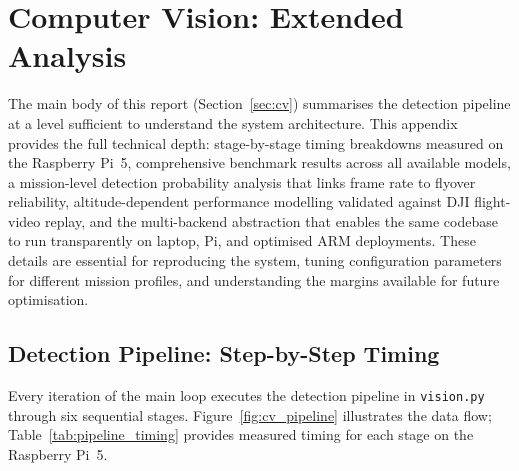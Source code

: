 
\section{Computer Vision: Extended Analysis}\label{app:cv-extended}

The main body of this report (Section~\ref{sec:cv}) summarises the detection pipeline at a level sufficient to understand the system architecture.  This appendix provides the full technical depth: stage-by-stage timing breakdowns measured on the Raspberry Pi~5, comprehensive benchmark results across all available models, a mission-level detection probability analysis that links frame rate to flyover reliability, altitude-dependent performance modelling validated against DJI flight-video replay, and the multi-backend abstraction that enables the same codebase to run transparently on laptop, Pi, and optimised ARM deployments.  These details are essential for reproducing the system, tuning configuration parameters for different mission profiles, and understanding the margins available for future optimisation.

\subsection{Detection Pipeline: Step-by-Step Timing}\label{app:cv:pipeline}

Every iteration of the main loop executes the detection pipeline in \texttt{vision.py} through six sequential stages.  Figure~\ref{fig:cv_pipeline} illustrates the data flow; Table~\ref{tab:pipeline_timing} provides measured timing for each stage on the Raspberry Pi~5.

